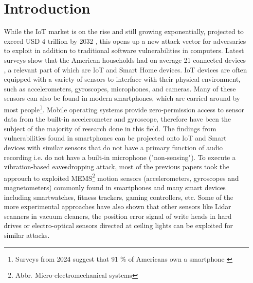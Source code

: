 \documentclass[sigconf, nonacm]{acmart}
\begin{document}



\maketitle

\section{Introduction}
While the IoT market is on the rise and still growing exponentially, projected to exceed USD 4 trillion by 2032 \cite{FortuneBusinessInsights2024}, this opens up a new attack vector for adversaries to exploit in addition to traditional software vulnerabilities in computers.
Latest surveys show that the American households had on average 21 connected devices \cite{DeloitteConnectedConsumer2023}, a relevant part of which are IoT and Smart Home devices.
IoT devices are often equipped with a variety of sensors to interface with their physical environment, such as accelerometers, gyroscopes, microphones, and cameras.
Many of these sensors can also be found in modern smartphones, which are carried around by most people\footnote{Surveys from 2024 suggest that 91 \% of Americans own a smartphone \cite{PewResearchMobileFactSheet2024}}. Mobile operating systems provide zero-permission access to sensor data from the built-in accelerometer and gyroscope, therefore have been the subject of the majority of research done in this field.
The findings from vulnerabilities found in smartphones can be projected onto IoT and Smart devices with similar sensors that do not have a primary function of audio recording i.e. do not have a built-in microphone ("non-sensing").
To execute a vibration-based eavesdropping attack, most of the previous papers took the approuch to exploited MEMS\footnote{Abbr. Micro-electromechanical systems} motion sensors (accelerometers, gyroscopes and magnetometers) commonly found in smartphones and many smart devices including smartwatches, fitness trackers, gaming controllers, etc.
Some of the more experimental approaches have also shown that other sensors like Lidar scanners in vacuum cleaners, the position error signal of write heads in hard drives or electro-optical sensors directed at ceiling lights can be exploited for similar attacks.
\end{document}
